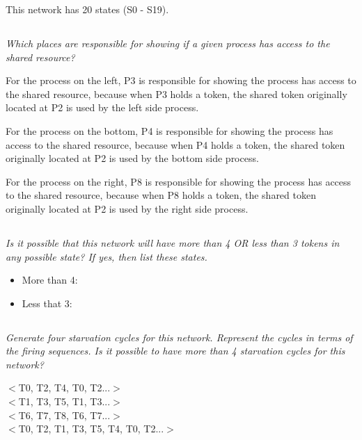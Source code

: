 \documentclass[letterpaper]{article}
\begin{document}
This network has 20 states (S0 - S19).

\subsection{}
\textit{Which places are responsible for showing if a given process has access to the shared resource?}

For the process on the left, P3 is responsible for showing the process has access
to the shared resource, because when P3 holds a token, the shared token originally
located at P2 is used by the left side process.

For the process on the bottom, P4 is responsible for showing the process has access
to the shared resource, because when P4 holds a token, the shared token originally
located at P2 is used by the bottom side process.

For the process on the right, P8 is responsible for showing the process has access
to the shared resource, because when P8 holds a token, the shared token originally
located at P2 is used by the right side process.

\subsection{}
\textit{Is it possible that this network will have more than 4 OR less than 3 tokens in any possible state?
 If yes, then list these states.
}

\begin{itemize}
 \item More than 4:
 \item Less that 3:
\end{itemize}

\subsection{}
\textit{Generate four starvation cycles for this network. Represent the cycles in terms of the firing sequences. Is it possible to have more than 4 starvation cycles for this network?}


$<$T0, T2, T4, T0, T2...$>$\\

$<$T1, T3, T5, T1, T3...$>$\\

$<$T6, T7, T8, T6, T7...$>$\\

$<$T0, T2, T1, T3, T5, T4, T0, T2...$>$\\
\end{document}
